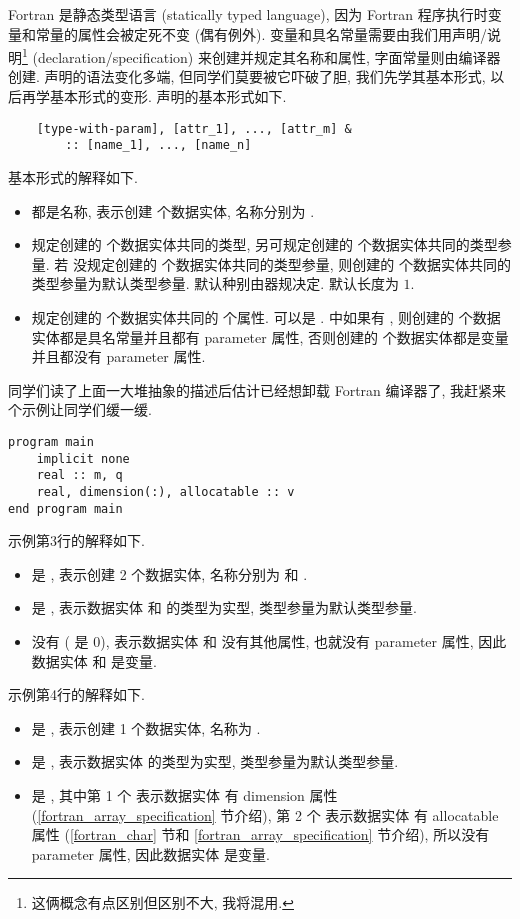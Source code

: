 Fortran 是静态类型语言 (statically typed language), 因为 Fortran 程序执行时变量和常量的属性会被定死不变 (偶有例外). 变量和具名常量需要由我们用声明/说明\footnote{这俩概念有点区别但区别不大, 我将混用.} (declaration/specification) 来创建并规定其名称和属性, 字面常量则由编译器创建. 声明的语法变化多端, 但同学们莫要被它吓破了胆, 我们先学其基本形式, 以后再学基本形式的变形. 声明的基本形式如下.
\begin{lstlisting}
    [type-with-param], [attr_1], ..., [attr_m] &
        :: [name_1], ..., [name_n]
\end{lstlisting}
基本形式的解释如下.
\begin{itemize}
    \item {} 都是名称, 表示创建  个数据实体, 名称分别为 .
    \item {} 规定创建的  个数据实体共同的类型, 另可规定创建的  个数据实体共同的类型参量. 若  没规定创建的  个数据实体共同的类型参量, 则创建的  个数据实体共同的类型参量为默认类型参量. 默认种别由器规决定. 默认长度为 $1$.
    \item {} 规定创建的  个数据实体共同的  个属性.  可以是 .  中如果有 , 则创建的  个数据实体都是具名常量并且都有 parameter 属性, 否则创建的  个数据实体都是变量并且都没有 parameter 属性.
\end{itemize}
同学们读了上面一大堆抽象的描述后估计已经想卸载 Fortran 编译器了, 我赶紧来个示例让同学们缓一缓. 
\begin{lstlisting}
program main
    implicit none
    real :: m, q
    real, dimension(:), allocatable :: v
end program main
\end{lstlisting}
示例第3行的解释如下.
\begin{itemize}
    \item {} 是 , 表示创建 2 个数据实体, 名称分别为  和 .
    \item {} 是 , 表示数据实体  和  的类型为实型, 类型参量为默认类型参量.
    \item {} 没有 ( 是 0), 表示数据实体  和  没有其他属性, 也就没有 parameter 属性, 因此数据实体  和 是变量.
\end{itemize}
示例第4行的解释如下.
\begin{itemize}
    \item {} 是 , 表示创建 1 个数据实体, 名称为 .
    \item {} 是 , 表示数据实体  的类型为实型, 类型参量为默认类型参量.
    \item {} 是 , 其中第 1 个  表示数据实体  有 dimension 属性 (\ref{fortran_array_specification} 节介绍), 第 2 个  表示数据实体  有 allocatable 属性 (\ref{fortran_char} 节和 \ref{fortran_array_specification} 节介绍), 所以没有 parameter 属性, 因此数据实体  是变量.
\end{itemize}
